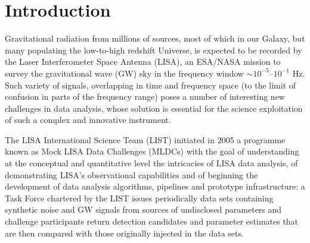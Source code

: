 \documentclass{iopart}
\begin{document}
\vspace{-18pt}


\section{Introduction}

Gravitational radiation from millions of sources, most of which in our Galaxy, but many populating the low-to-high redshift Universe, is expected to be recorded by the Laser Interferometer Space Antenna (LISA), an ESA/NASA mission to survey the gravitational wave (GW) sky in the frequency window $\sim 10^{-5}$--$10^{-1}$ Hz\cite{lisa}. Such variety of signals, overlapping in time and frequency space (to the limit of confusion in parts of the frequency range) poses a number of interesting new challenges in data analysis, whose solution is essential for the science exploitation of such a complex and innovative instrument.



The LISA International Science Team (LIST) initiated in 2005 a programme known as Mock LISA Data Challenges (MLDCs) with the goal of understanding at the conceptual and quantitative level the intricacies of LISA data analysis, of demonstrating LISA's observational capabilities and of beginning the development of data analysis algorithms, pipelines and prototype infrastructure: a Task Force chartered by the LIST issues periodically data sets containing synthetic noise and GW signals from sources of undisclosed parameters and challenge participants return detection candidates and parameter estimates that are then compared with those originally injected in the data sets.
\end{document}
